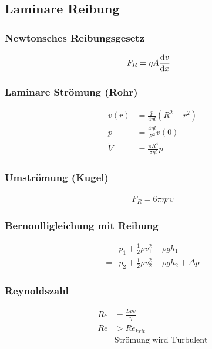 \subsection{Laminare Reibung}

\begin{multicols}{2}{}
\subsubsection{Newtonsches Reibungsgesetz}
\begin{align*}
F_R&=\eta A \frac{\mathop{}\!\mathrm{d} v}{\mathop{}\!\mathrm{d} x}
\end{align*}


\subsubsection{Laminare Strömung (Rohr)}
\begin{align*}
v(r)&=\frac{p}{4\eta l}\left(R^2-r^2\right)\\
p&=\frac{4\eta l}{R^2}v(0)\\
\dot{V}&=\frac{\pi R^4}{8\eta l}p
\end{align*}


\subsubsection{Umströmung (Kugel)}
\begin{align*}
F_R=6\pi\eta r v
\end{align*}



\subsubsection{Bernoulligleichung mit Reibung}
\begin{align*}
&p_1+\frac{1}{2}\rho v_1^2+ \rho g h_1 \\
=&p_2+\frac{1}{2}\rho v_2^2+ \rho g h_2+\Delta p
\end{align*}


\subsubsection{Reynoldszahl}
\begin{align*}
Re&=\frac{L\rho v}{\eta}\\
Re&>Re_{krit}\\
&\text{Strömung wird Turbulent}
\end{align*}
\end{multicols}
